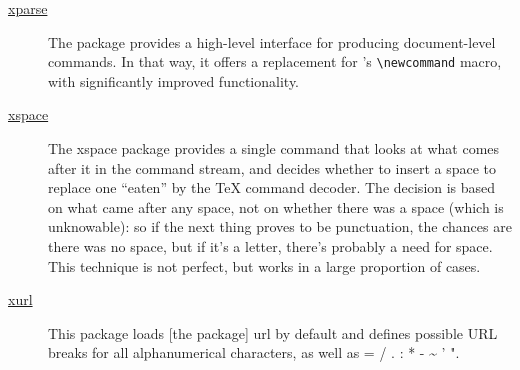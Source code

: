 \begin{description}
	\item[\href{https://www.ctan.org/pkg/xparse}{xparse}] The package provides a high-level interface for producing document-level commands. In that way, it offers a replacement for \LaTeXe's \verb|\newcommand| macro, with significantly improved functionality. \cite{CTANTeam.2020br}
	
	\item[\href{https://www.ctan.org/pkg/xspace}{xspace}] The xspace package provides a single command that looks at what comes after it in the command stream, and decides whether to insert a space to replace one \enquote{eaten} by the {\TeX} command decoder. The decision is based on what came after any space, not on whether there was a space (which is unknowable): so if the next thing proves to be punctuation, the chances are there was no space, but if it's a letter, there's probably a need for space. This technique is not perfect, but works in a large proportion of cases. \cite{CTANTeam.2020an}
	
	\item[\href{https://www.ctan.org/pkg/xurl}{xurl}] This package loads [the package] url by default and defines possible URL breaks for all alphanumerical characters, as well as = / . : * - \textasciitilde{} ' ". \cite{CTANTeam.2020ao}
\end{description}